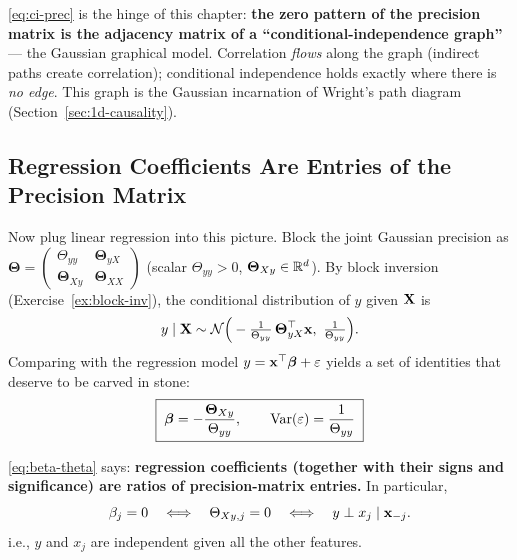 \eqref{eq:ci-prec} is the hinge of this chapter: \textbf{the zero pattern of the precision matrix is the adjacency matrix of a ``conditional-independence graph''} — the Gaussian graphical model\cite{lauritzen1996}. Correlation \textit{flows} along the graph (indirect paths create correlation); conditional independence holds exactly where there is \emph{no edge}. This graph is the Gaussian incarnation of Wright's path diagram (Section~\ref{sec:1d-causality}).

\subsection{Regression Coefficients Are Entries of the Precision Matrix}\label{sec:beta-theta}

Now plug linear regression into this picture. Block the joint Gaussian precision as $\bm{\Theta} = \begin{pmatrix} \Theta_{yy} & \bm{\Theta}_{yX} \\ \bm{\Theta}_{Xy} & \bm{\Theta}_{XX} \end{pmatrix}$ (scalar $\Theta_{yy} > 0$, $\bm{\Theta}_{Xy} \in \mathbb{R}^d$). By block inversion (Exercise~\ref{ex:block-inv}), the conditional distribution of $y$ given $\mathbf{X}$ is
\begin{equation}\label{eq:conditional}
  y \mid \mathbf{X} \sim \mathcal{N}\Big( -\tfrac{1}{\Theta_{yy}}\, \bm{\Theta}_{yX}^\top \mathbf{x},\ \tfrac{1}{\Theta_{yy}} \Big).
\end{equation}
Comparing with the regression model $y = \mathbf{x}^\top \bm{\beta} + \varepsilon$ yields a set of identities that deserve to be carved in stone:
\begin{equation}\label{eq:beta-theta}
  \boxed{\;\bm{\beta} = -\frac{\bm{\Theta}_{Xy}}{\Theta_{yy}}, \qquad \mathrm{Var}(\varepsilon) = \frac{1}{\Theta_{yy}}\;}
\end{equation}

\begin{keybox}[Regression $=$ probing the graph]
\eqref{eq:beta-theta} says: \textbf{regression coefficients (together with their signs and significance) are ratios of precision-matrix entries.} In particular,
\[
  \beta_j = 0
  \quad\Longleftrightarrow\quad
  \Theta_{Xy,j} = 0
  \quad\Longleftrightarrow\quad
  y \perp x_j \mid \mathbf{x}_{-j} .
\]
i.e., $y$ and $x_j$ are independent given all the other features.
\end{keybox}

